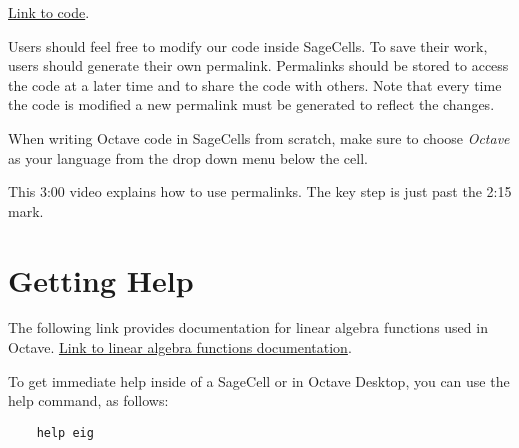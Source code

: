 \documentclass{ximera}
\begin{document}
\href{https://sagecell.sagemath.org/?z=eJxLySwu0FD3SM3JyddRKM8vyklRVNe0BgBW7AcU&lang=octave&interacts=eJyLjgUAARUAuQ==}{Link to code}.

Users should feel free to modify our code inside SageCells.  To save their work, users should generate their own permalink.  Permalinks should be stored to access the code at a later time and to share the code with others.  Note that every time the code is modified a new permalink must be generated to reflect the changes.

When writing Octave code in SageCells from scratch, make sure to choose \emph{Octave} as your language from the drop down menu below the cell.

This 3:00 video explains how to use permalinks.  The key step is just past the 2:15 mark.


\section*{Getting Help}
The following link provides documentation for linear algebra functions used in Octave.  \href{https://docs.octave.org/interpreter/Linear-Algebra.html}{Link to linear algebra functions documentation}.

To get immediate help inside of a SageCell or in Octave Desktop, you can use the help command, as follows:

\begin{verbatim}
    help eig
\end{verbatim}
\end{document}
